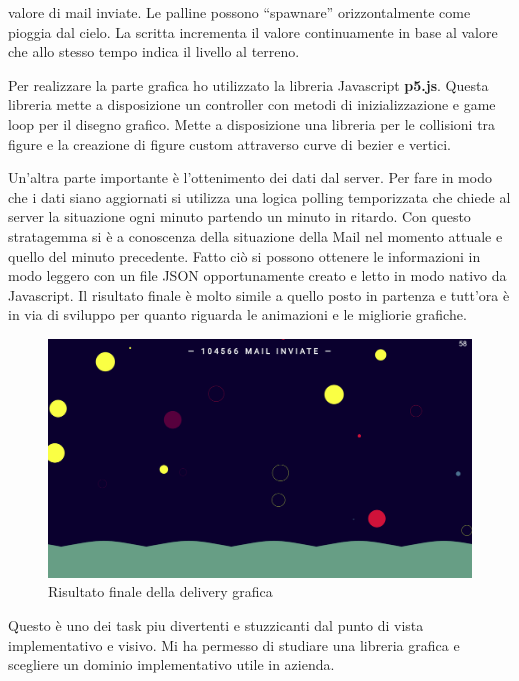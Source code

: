 \documentclass[a4paper]{article}
\begin{document}
valore di mail inviate. Le palline possono ``spawnare'' orizzontalmente come pioggia dal
cielo. La scritta incrementa il valore continuamente in base al valore che allo stesso tempo
indica il livello al terreno.
\par Per realizzare la parte grafica ho utilizzato la libreria Javascript \textbf{p5.js}.
Questa libreria mette a disposizione un controller con metodi di inizializzazione e game loop
per il disegno grafico. Mette a disposizione una libreria per le collisioni tra figure e la creazione
di figure custom attraverso curve di bezier e vertici.
\par Un'altra parte importante è l'ottenimento dei dati dal server. Per fare in modo che i dati
siano aggiornati si utilizza una logica polling temporizzata che chiede al server la situazione
ogni minuto partendo un minuto in ritardo. Con questo stratagemma si è a conoscenza della situazione della Mail
nel momento attuale e quello del minuto precedente. Fatto ciò si possono ottenere le informazioni
in modo leggero con un file JSON opportunamente creato e letto in modo nativo da Javascript.
Il risultato finale è molto simile a quello posto in partenza e tutt'ora è in via di sviluppo per 
quanto riguarda le animazioni e le migliorie grafiche.
\begin{figure}[H]
	\includegraphics[width=\textwidth]{delivery-final.png}
	\centering
	\caption{Risultato finale della delivery grafica}
\end{figure}
\par Questo è uno dei task piu divertenti e stuzzicanti dal punto di vista implementativo e
visivo. Mi ha permesso di studiare una libreria grafica e scegliere un dominio implementativo 
utile in azienda.
\end{document}

